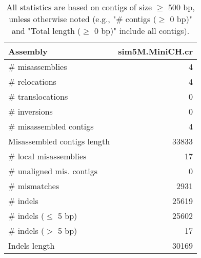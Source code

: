 \documentclass[12pt,a4paper]{article}
\begin{document}
\begin{table}[ht]
\begin{center}
\caption{All statistics are based on contigs of size $\geq$ 500 bp, unless otherwise noted (e.g., "\# contigs ($\geq$ 0 bp)" and "Total length ($\geq$ 0 bp)" include all contigs).}
\begin{tabular}{|l*{1}{|r}|}
\hline
Assembly & sim5M.MiniCH.cr \\ \hline
\# misassemblies & 4 \\ \hline
\hspace{5mm}\# relocations & 4 \\ \hline
\hspace{5mm}\# translocations & 0 \\ \hline
\hspace{5mm}\# inversions & 0 \\ \hline
\# misassembled contigs & 4 \\ \hline
Misassembled contigs length & 33833 \\ \hline
\# local misassemblies & 17 \\ \hline
\# unaligned mis. contigs & 0 \\ \hline
\# mismatches & 2931 \\ \hline
\# indels & 25619 \\ \hline
\hspace{5mm}\# indels ($\leq$ 5 bp) & 25602 \\ \hline
\hspace{5mm}\# indels ($>$ 5 bp) & 17 \\ \hline
Indels length & 30169 \\ \hline
\end{tabular}
\end{center}
\end{table}
\end{document}
